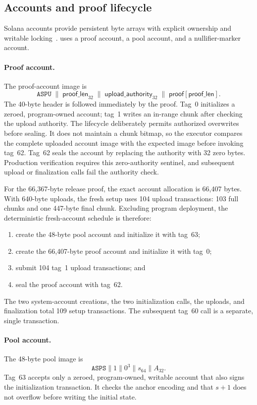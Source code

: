 \subsection{Accounts and proof lifecycle}
\label{sec:implementation-accounts}

Solana accounts provide persistent byte arrays with explicit ownership and
writable locking~\cite{SolanaAccounts,SolanaTransactions}.  \Profile{} uses a
proof account, a pool account, and a nullifier-marker account.

\paragraph{Proof account.}
The proof-account image is
\[
  \mathtt{ASPU}\;\mathbin\|\;
  \mathsf{proof\_len}_{32}\;\mathbin\|\;
  \mathsf{upload\_authority}_{32}\;\mathbin\|\;
  \mathsf{proof}[\mathsf{proof\_len}].
\]
The 40-byte header is followed immediately by the proof.  Tag~0 initializes a
zeroed, program-owned account; tag~1 writes an in-range chunk after checking
the upload authority.  The lifecycle deliberately permits authorized
overwrites before sealing.  It does not maintain a chunk bitmap, so the
executor compares the complete uploaded account image with the expected image
before invoking tag~62.  Tag~62 seals the account by replacing the authority
with 32 zero bytes.  Production verification requires this zero-authority
sentinel, and subsequent upload or finalization calls fail the authority
check.

For the 66,367-byte release proof, the exact account allocation is 66,407
bytes.  With 640-byte uploads, the fresh setup uses 104 upload transactions:
103 full chunks and one 447-byte final chunk.  Excluding program deployment,
the deterministic fresh-account schedule is therefore:
\begin{enumerate}
  \item create the 48-byte pool account and initialize it with tag~63;
  \item create the 66,407-byte proof account and initialize it with tag~0;
  \item submit 104 tag~1 upload transactions; and
  \item seal the proof account with tag~62.
\end{enumerate}
The two system-account creations, the two initialization calls, the uploads,
and finalization total 109 setup transactions.  The subsequent tag~60 call is
a separate, single transaction.

\paragraph{Pool account.}
The 48-byte pool image is
\[
  \mathtt{ASPS}\mathbin\|1\mathbin\|0^3
  \mathbin\|s_{64}\mathbin\|A_{32}.
\]
Tag~63 accepts only a zeroed, program-owned, writable account that also signs
the initialization transaction.  It checks the anchor encoding and that
\(s+1\) does not overflow before writing the initial state.


